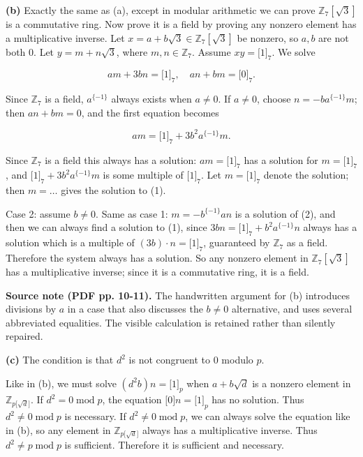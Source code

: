 \textbf{(b)} Exactly the same as (a), except in modular arithmetic we can prove \(\mathbb{Z}_{7}\left\lbrack \sqrt{3} \right\rbrack\) is a commutative ring. Now prove it is a field by proving any nonzero element has a multiplicative inverse. Let \(x = a + b\sqrt{3} \in \mathbb{Z}_{7}\left\lbrack \sqrt{3} \right\rbrack\) be nonzero, so \(a,b\) are not both \(0\). Let \(y = m + n\sqrt{3}\), where \(m,n \in \mathbb{Z}_{7}\). Assume \(xy = \lbrack 1\rbrack_{7}\). We solve

\[am + 3bn = \lbrack 1\rbrack_{7},\quad an + bm = \lbrack 0\rbrack_{7}.\]

Since \(\mathbb{Z}_{7}\) is a field, \(a^{\{{- 1}\}}\) always exists when \(a \neq 0\). If \(a \neq 0\), choose \(n = - ba^{\{{- 1}\}}m\); then \(an + bm = 0\), and the first equation becomes

\[am = \lbrack 1\rbrack_{7} + 3b^{2}a^{\{{- 1}\}}m.\]

Since \(\mathbb{Z}_{7}\) is a field this always has a solution: \(am = \lbrack 1\rbrack_{7}\) has a solution for \(m = \lbrack 1\rbrack_{7}\), and \(\lbrack 1\rbrack_{7} + 3b^{2}a^{\{{- 1}\}}m\) is some multiple of \(\lbrack 1\rbrack_{7}\). Let \(m = \lbrack 1\rbrack_{7}\) denote the solution; then \(m = \ldots\) gives the solution to (1).

Case 2: assume \(b \neq 0\). Same as case 1: \(m = - b^{\{{- 1}\}}an\) is a solution of (2), and then we can always find a solution to (1), since \(3bn = \lbrack 1\rbrack_{7} + b^{2}a^{\{{- 1}\}}n\) always has a solution which is a multiple of \(\left( {3b} \right) \cdot n = \lbrack 1\rbrack_{7}\), guaranteed by \(\mathbb{Z}_{7}\) as a field. Therefore the system always has a solution. So any nonzero element in \(\mathbb{Z}_{7}\left\lbrack \sqrt{3} \right\rbrack\) has a multiplicative inverse; since it is a commutative ring, it is a field.

{\textbf{Source note (PDF pp. 10-11).} The handwritten argument for (b) introduces divisions by \(a\) in a case that also discusses the \(b \neq 0\) alternative, and uses several abbreviated equalities. The visible calculation is retained rather than silently repaired.}

\textbf{(c)} The condition is that \(d^{2}\) is not congruent to \(0\) modulo \(p\).

Like in (b), we must solve \(\left( {d^{2}b} \right)n = \lbrack 1\rbrack_{p}\) when \(a + b\sqrt{d}\) is a nonzero element in \(\mathbb{Z}_{p{\lbrack\sqrt{d}\rbrack}}\). If \(d^{2} = 0\operatorname{mod}p\), the equation \(\lbrack 0\rbrack n = \lbrack 1\rbrack_{p}\) has no solution. Thus \(d^{2} \neq 0\operatorname{mod}p\) is necessary. If \(d^{2} \neq 0\operatorname{mod}p\), we can always solve the equation like in (b), so any element in \(\mathbb{Z}_{p{\lbrack\sqrt{d}\rbrack}}\) always has a multiplicative inverse. Thus \(d^{2} \neq p\operatorname{mod}p\) is sufficient. Therefore it is sufficient and necessary.

